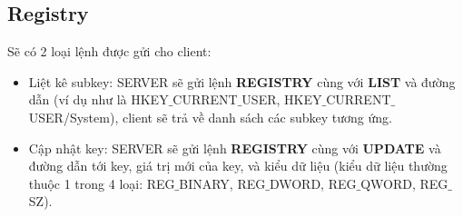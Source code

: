 \subsection{Registry}
Sẽ có 2 loại lệnh được gửi cho client:
\begin{itemize}
\item Liệt kê subkey: SERVER sẽ gửi lệnh \textbf{REGISTRY} cùng với \textbf{LIST} và đường dẫn (ví dụ như là HKEY$\_$CURRENT$\_$USER, HKEY$\_$CURRENT$\_$USER/System), client sẽ trả về danh sách các subkey tương ứng.
\item Cập nhật key: SERVER sẽ gửi lệnh \textbf{REGISTRY} cùng với \textbf{UPDATE} và đường dẫn tới key, giá trị mới của key, và kiểu dữ liệu (kiểu dữ liệu thường thuộc 1 trong 4 loại: REG$\_$BINARY, REG$\_$DWORD, REG$\_$QWORD, REG$\_$SZ).
\end{itemize}

